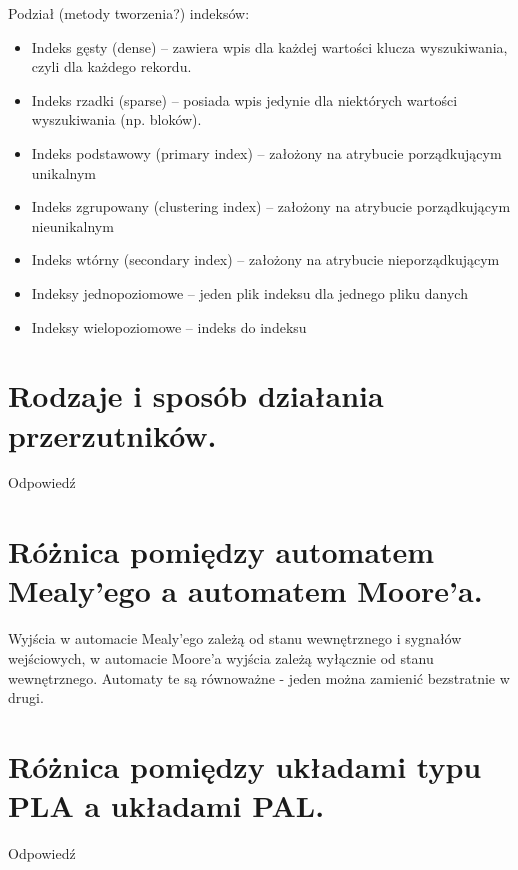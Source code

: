 \documentclass[12pt,a4paper]{article}
\begin{document}
	Podział (metody tworzenia?) indeksów:
	\begin{itemize}
		\item Indeks gęsty (dense) – zawiera wpis dla każdej wartości klucza wyszukiwania, czyli dla każdego rekordu.
		\item Indeks rzadki (sparse) – posiada wpis jedynie dla niektórych wartości wyszukiwania (np. bloków).
		\item Indeks podstawowy (primary index) – założony na atrybucie porządkującym unikalnym
		\item Indeks zgrupowany (clustering index) – założony na atrybucie porządkującym nieunikalnym
		\item Indeks wtórny (secondary index) – założony na atrybucie nieporządkującym
		\item Indeksy jednopoziomowe – jeden plik indeksu dla jednego pliku danych
		\item Indeksy wielopoziomowe – indeks do indeksu
	\end{itemize}

	\section{Rodzaje i sposób działania przerzutników.}
	Odpowiedź

	\section{Różnica pomiędzy automatem Mealy'ego a automatem Moore'a.}
	Wyjścia w automacie Mealy'ego zależą od stanu wewnętrznego i sygnałów wejściowych, w automacie Moore'a wyjścia zależą wyłącznie od stanu wewnętrznego. Automaty te są równoważne - jeden można zamienić bezstratnie w drugi.

	\section{Różnica pomiędzy układami typu PLA a układami PAL.}
	Odpowiedź
\end{document}
